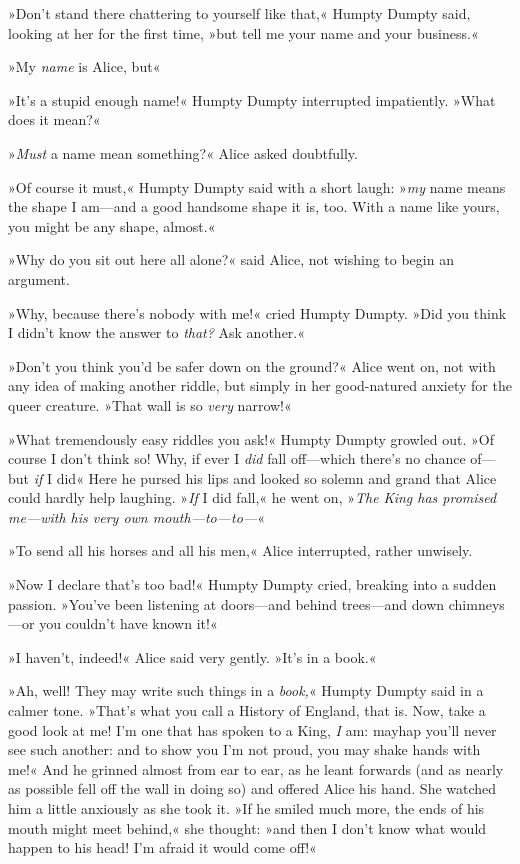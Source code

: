 »Don't stand there chattering to yourself like that,« Humpty Dumpty said, looking at her for the first time, »but tell me your name and your business.«

»My \textit{name} is Alice, but\longdash«

»It's a stupid enough name!« Humpty Dumpty interrupted impatiently. »What does it mean?«

»\textit{Must} a name mean something?« Alice asked doubtfully.

»Of course it must,« Humpty Dumpty said with a short laugh: »\textit{my} name means the shape I am—and a good handsome shape it is, too. With a name like yours, you might be any shape, almost.«

»Why do you sit out here all alone?« said Alice, not wishing to begin an argument.

»Why, because there's nobody with me!« cried Humpty Dumpty. »Did you think I didn't know the answer to \textit{that?} Ask another.«

»Don't you think you'd be safer down on the ground?« Alice went on, not with any idea of making another riddle, but simply in her good-natured anxiety for the queer creature. »That wall is so \textit{very} narrow!«

»What tremendously easy riddles you ask!« Humpty Dumpty growled out. »Of course I don't think so! Why, if ever I \textit{did} fall off—which there's no chance of—but \textit{if} I did\longdash« Here he pursed his lips and looked so solemn and grand that Alice could hardly help laughing. »\textit{If} I did fall,« he went on, »\textit{The King has promised me—with his very own mouth—to—to—}«

»To send all his horses and all his men,« Alice interrupted, rather unwisely.

»Now I declare that's too bad!« Humpty Dumpty cried, breaking into a sudden passion. »You've been listening at doors—and behind trees—and down chimneys—or you couldn't have known it!«

»I haven't, indeed!« Alice said very gently. »It's in a book.«

»Ah, well! They may write such things in a \textit{book,}« Humpty Dumpty said in a calmer tone. »That's what you call a History of England, that is. Now, take a good look at me! I'm one that has spoken to a King, \textit{I} am: mayhap you'll never see such another: and to show you I'm not proud, you may shake hands with me!« And he grinned almost from ear to ear, as he leant forwards (and as nearly as possible fell off the wall in doing so) and offered Alice his hand. She watched him a little anxiously as she took it. »If he smiled much more, the ends of his mouth might meet behind,« she thought: »and then I don't know what would happen to his head! I'm afraid it would come off!«

